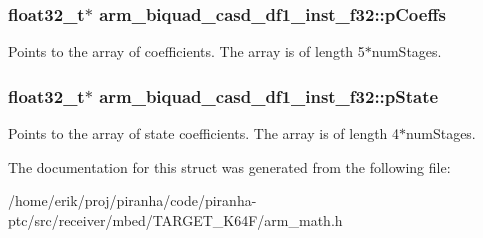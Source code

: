\subsubsection[{\texorpdfstring{p\+Coeffs}{pCoeffs}}]{\setlength{\rightskip}{0pt plus 5cm}float32\+\_\+t$\ast$ arm\+\_\+biquad\+\_\+casd\+\_\+df1\+\_\+inst\+\_\+f32\+::p\+Coeffs}\hypertarget{structarm__biquad__casd__df1__inst__f32_af9df3820576fb921809d1462c9c6d16c}{}\label{structarm__biquad__casd__df1__inst__f32_af9df3820576fb921809d1462c9c6d16c}
Points to the array of coefficients. The array is of length 5$\ast$num\+Stages. 
\subsubsection[{\texorpdfstring{p\+State}{pState}}]{\setlength{\rightskip}{0pt plus 5cm}float32\+\_\+t$\ast$ arm\+\_\+biquad\+\_\+casd\+\_\+df1\+\_\+inst\+\_\+f32\+::p\+State}\hypertarget{structarm__biquad__casd__df1__inst__f32_a8c245d79e0d8cfabc82409d4b54fb682}{}\label{structarm__biquad__casd__df1__inst__f32_a8c245d79e0d8cfabc82409d4b54fb682}
Points to the array of state coefficients. The array is of length 4$\ast$num\+Stages. 

The documentation for this struct was generated from the following file\+:\begin{DoxyCompactItemize}
\item 
/home/erik/proj/piranha/code/piranha-\/ptc/src/receiver/mbed/\+T\+A\+R\+G\+E\+T\+\_\+\+K64\+F/arm\+\_\+math.\+h\end{DoxyCompactItemize}
